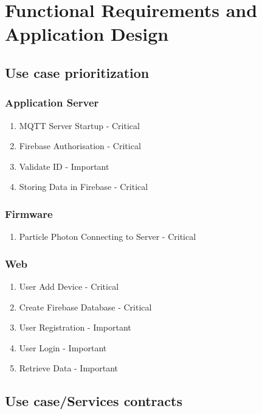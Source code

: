 \documentclass{article}
\begin{document}
	\section{Functional Requirements and Application Design}
	\subsection{Use case prioritization}
	\subsubsection{Application Server}
	\begin{enumerate}
		\item	MQTT Server Startup - Critical
		\item	Firebase Authorisation - Critical
		\item	Validate ID - Important
		\item	Storing Data in Firebase - Critical
	\end{enumerate}
	\subsubsection{Firmware}
	\begin{enumerate}
		\item	Particle Photon Connecting to Server - Critical
	\end{enumerate}
	\subsubsection{Web}
	\begin{enumerate}
		\item	User Add Device - Critical
		\item	Create Firebase Database - Critical
		\item	User Registration - Important
		\item	User Login - Important
		\item	Retrieve Data  - Important
	\end{enumerate}
	\subsection{Use case/Services contracts}
\end{document}

